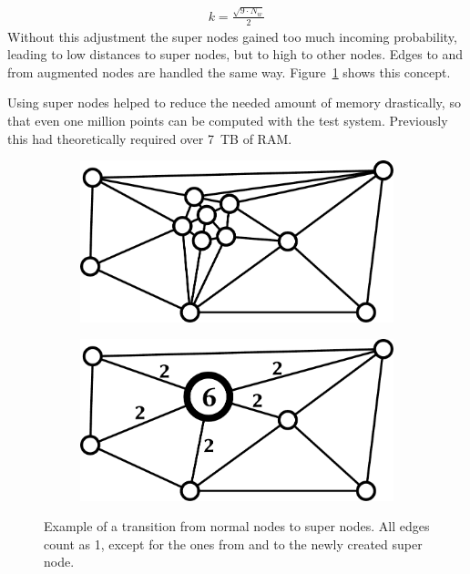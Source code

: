\begin{align}
k =  \frac{\sqrt{9 \cdot N_w}}{2}
\end{align}
%
Without this adjustment the super nodes gained too much incoming probability, leading to low distances to super nodes, but to high to other nodes. Edges to and from augmented nodes are handled the same way. Figure~\ref{fig:w_nodes} shows this concept.

Using super nodes helped to reduce the needed amount of memory drastically, so that even one million points can be computed with the test system. Previously this had theoretically required over 7~TB of RAM.

\begin{figure}[h]
\centering
	\begin{subfigure}[b]{0.4\textwidth}
		\centering
		\includegraphics[width=\textwidth]{pix/w_nodes1.pdf}
	\end{subfigure}
	\hfill
	\begin{subfigure}[b]{0.4\textwidth}
		\centering
		\includegraphics[width=\textwidth]{pix/w_nodes2.pdf}
	\end{subfigure}
\caption[Transition from normal nodes to a super node.]{Example of a transition from normal nodes to super nodes. All edges count as 1, except for the ones from and to the newly created super node.}\label{fig:w_nodes}
\end{figure}

